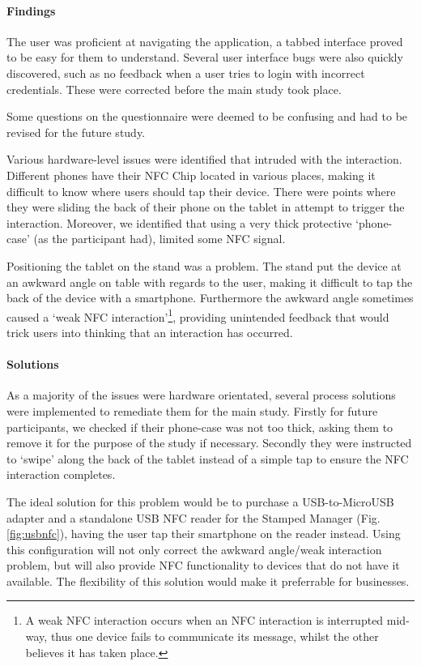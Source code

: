 \paragraph{Findings}

The user was proficient at navigating the application, a tabbed interface proved to be easy for them to understand. Several user interface bugs were also quickly discovered, such as no feedback when a user tries to login with incorrect credentials. These were corrected before the main study took place.

Some questions on the questionnaire were deemed to be confusing and had to be revised for the future study. 

Various hardware-level issues were identified that intruded with the interaction. Different phones have their NFC Chip located in various places, making it difficult to know where users should tap their device. There were points where they were sliding the back of their phone on the tablet in attempt to trigger the interaction. Moreover, we identified that using a very thick protective `phone-case' (as the participant had), limited some NFC signal.

Positioning the tablet on the stand was a problem. The stand put the device at an awkward angle on table with regards to the user, making it difficult to tap the back of the device with a smartphone. Furthermore the awkward angle sometimes caused a `weak NFC interaction'\footnote{A weak NFC interaction occurs when an NFC interaction is interrupted mid-way, thus one device fails to communicate its message, whilst the other believes it has taken place.}, providing unintended feedback that would trick users into thinking that an interaction has occurred.

\paragraph{Solutions}
\label{sec:idealsolution}
As a majority of the issues were hardware orientated, several process solutions were implemented to remediate them for the main study. Firstly for future participants, we checked if their phone-case was not too thick, asking them to remove it for the purpose of the study if necessary. Secondly they were instructed to `swipe' along the back of the tablet instead of a simple tap to ensure the NFC interaction completes. 

The ideal solution for this problem would be to purchase a USB-to-MicroUSB adapter and a standalone USB NFC reader for the Stamped Manager (Fig. \ref{fig:usbnfc}), having the user tap their smartphone on the reader instead. Using this configuration will not only correct the awkward angle/weak interaction problem, but will also provide NFC functionality to devices that do not have it available.  The flexibility of this solution would make it preferrable for businesses.

